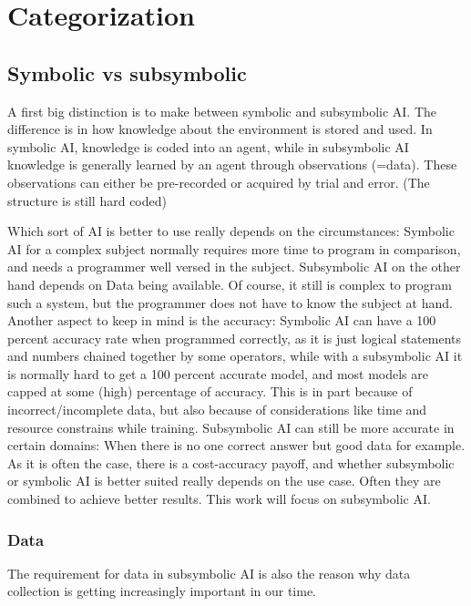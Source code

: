 \chapter{Categorization}
\section{Symbolic vs subsymbolic}
A first big distinction is to make between symbolic and subsymbolic AI. 
The difference is in how knowledge about the environment is stored and used. %
In symbolic AI, knowledge is coded into an agent, while in subsymbolic AI knowledge is generally learned by an agent through observations (=data). These observations can either be pre-recorded or acquired by trial and error. (The structure is still hard coded)

Which sort of AI is better to use really depends on the circumstances: 
Symbolic AI for a complex subject normally requires more time to program in comparison, and needs a programmer well versed in the subject. 
Subsymbolic AI on the other hand depends on Data being available. Of course, it still is complex to program such a system, but the programmer does not have to know the subject at hand. %
Another aspect to keep in mind is the accuracy: Symbolic AI can have a 100 percent accuracy rate when programmed correctly, as it is just logical statements and numbers chained together by some operators, while with a subsymbolic AI it is normally hard to get a 100 percent accurate model, and most models are capped at some (high) percentage of accuracy. This is in part because of incorrect/incomplete data, but also because of considerations like time and resource constrains while training. Subsymbolic AI can still be more accurate in certain domains: When there is no one correct answer but good data for example.
As it is often the case, there is a cost-accuracy payoff, and whether subsymbolic or symbolic AI is better suited really depends on the use case. Often they are combined to achieve better results. This work will focus on subsymbolic AI. 
\subsection{Data}
The requirement for data in subsymbolic AI is also the reason why data collection is getting increasingly important in our time. 

